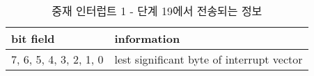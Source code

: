 %
%
\begin{table}[htbp]
\caption{중재 인터럽트 1 - 단계 19에서 전송되는 정보}\label{table:arb-int-p19}
   \begin{center}
   \begin{tabular}{|l|l|} \hline
	bit field & information \\
\hline \hline
	7, 6, 5, 4, 3, 2, 1, 0 & lest significant byte of interrupt vector \\
\hline
   \end{tabular}
   \end{center}
\end{table}
%
%
